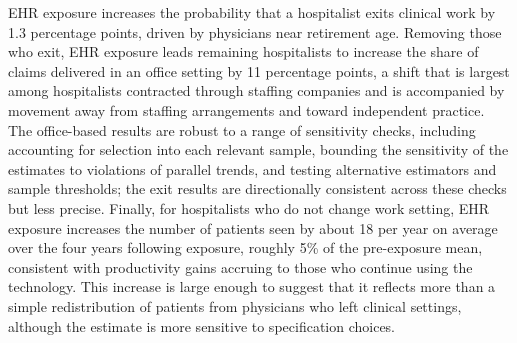 \documentclass[12pt]{article}
\begin{document}
EHR exposure increases the probability that a hospitalist exits clinical work by 1.3 percentage points, driven by physicians near retirement age. Removing those who exit, EHR exposure leads remaining hospitalists to increase the share of claims delivered in an office setting by 11 percentage points, a shift that is largest among hospitalists contracted through staffing companies and is accompanied by movement away from staffing arrangements and toward independent practice. The office-based results are robust to a range of sensitivity checks, including accounting for selection into each relevant sample, bounding the sensitivity of the estimates to violations of parallel trends, and testing alternative estimators and sample thresholds; the exit results are directionally consistent across these checks but less precise. Finally, for hospitalists who do not change work setting, EHR exposure increases the number of patients seen by about 18 per year on average over the four years following exposure, roughly 5\% of the pre-exposure mean, consistent with productivity gains accruing to those who continue using the technology. This increase is large enough to suggest that it reflects more than a simple redistribution of patients from physicians who left clinical settings, although the estimate is more sensitive to specification choices.
\end{document}
